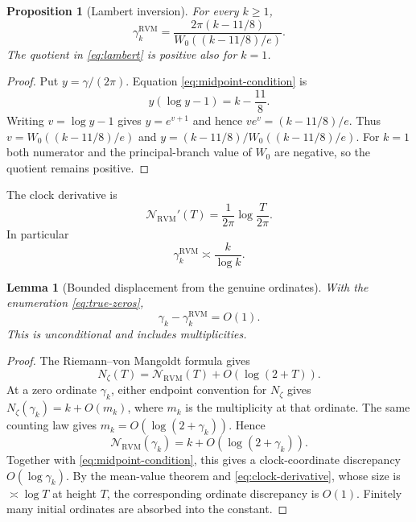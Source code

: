 \documentclass[11pt,reqno]{amsart}
\newtheorem{proposition}[theorem]{Proposition}
\newtheorem{lemma}[theorem]{Lemma}
\theoremstyle{definition}
\theoremstyle{remark}
\newcommand{\RVM}{\mathrm{RVM}}
\begin{document}
\begin{proposition}[Lambert inversion]\label{prop:lambert}
For every $k\ge1$,
\begin{equation}\label{eq:lambert}
 \boxed{
 \gamma_k^{\RVM}
 =\frac{2\pi(k-11/8)}{W_0((k-11/8)/e)}.}
\end{equation}
The quotient in \eqref{eq:lambert} is positive also for $k=1$.
\end{proposition}

\begin{proof}
Put $y=\gamma/(2\pi)$.  Equation \eqref{eq:midpoint-condition} is
\[
 y(\log y-1)=k-\frac{11}{8}.
\]
Writing $v=\log y-1$ gives $y=e^{v+1}$ and hence
$v e^v=(k-11/8)/e$.  Thus $v=W_0((k-11/8)/e)$ and
$y=(k-11/8)/W_0((k-11/8)/e)$.  For $k=1$ both numerator and the principal-branch value of $W_0$ are negative, so the quotient remains positive.
\end{proof}

The clock derivative is
\begin{equation}\label{eq:clock-derivative}
 \mathcal N_{\RVM}'(T)=\frac1{2\pi}\log\frac{T}{2\pi}.
\end{equation}
In particular
\begin{equation}\label{eq:clock-growth}
 \gamma_k^{\RVM}\asymp \frac{k}{\log k}.
\end{equation}

\begin{lemma}[Bounded displacement from the genuine ordinates]\label{lem:bounded-displacement}
With the enumeration \eqref{eq:true-zeros},
\begin{equation}\label{eq:bounded-displacement}
 \gamma_k-\gamma_k^{\RVM}=O(1).
\end{equation}
This is unconditional and includes multiplicities.
\end{lemma}

\begin{proof}
The Riemann--von Mangoldt formula gives
\[
 N_\zeta(T)=\mathcal N_{\RVM}(T)+O(\log(2+T)).
\]
At a zero ordinate $\gamma_k$, either endpoint convention for $N_\zeta$ gives
$N_\zeta(\gamma_k)=k+O(m_k)$, where $m_k$ is the multiplicity at that ordinate.  The same counting law gives $m_k=O(\log(2+\gamma_k))$.  Hence
\[
 \mathcal N_{\RVM}(\gamma_k)=k+O(\log(2+\gamma_k)).
\]
Together with \eqref{eq:midpoint-condition}, this gives a clock-coordinate discrepancy $O(\log\gamma_k)$.  By the mean-value theorem and \eqref{eq:clock-derivative}, whose size is $\asymp\log T$ at height $T$, the corresponding ordinate discrepancy is $O(1)$.  Finitely many initial ordinates are absorbed into the constant.
\end{proof}
\end{document}
